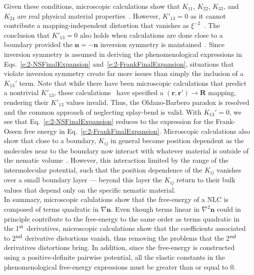 Given these conditions, microscopic calculations show that $K_{11}$, $K_{22}$, $K_{33}$, and $K_{24}$ are real physical material properties~\cite{RN55,RN56,RN225,RN224,RN217,RN222}.
However, $K'_{13} = 0$ as it cannot contribute a mapping-independent distortion that vanishes as $\xi^{-2}$~\cite{RN55,RN225}.
The conclusion that $K'_{13} = 0$ also holds when calculations are done close to a boundary provided the $\mathbf{n} = -\mathbf{n}$ inversion symmetry is maintained~\cite{RN56}.
Since inversion symmetry is assumed in deriving the phenomenological expressions in Eqs.~\ref{e:2-NSFinalExpansion} and~\ref{e:2-FrankFinalExpansion}, situations that violate inversion symmetry create far more issues than simply the inclusion of a $K_{13}'$ term.
Note that while there have been microscopic calculations that predict a nontrivial $K'_{13}$, these calculations~\cite{RN224,RN217,RN222} have specified a $(\mathbf{r},\mathbf{r}') \rightarrow \mathbf{R}$ mapping, rendering their $K'_{13}$ values invalid.
Thus, the Oldano-Barbero paradox is resolved and the common approach of neglecting splay-bend is valid.
With $K_{13}'=0$, we see that Eq.~\ref{e:2-NSFinalExpansion} reduces to the expression for the Frank-Oseen free energy in Eq.~\ref{e:2-FrankFinalExpansion}.
Microscopic calculations also show that close to a boundary, $K_{ij}$ in general become position dependent as the molecules near to the boundary now interact with whatever material is outside of the nematic volume~\cite{RN56,RN57,RN55}.
However, this interaction limited by the range of the intermolecular potential, such that the position dependence of the $K_{ij}$ vanishes over a small boundary layer --- beyond this layer the $K_{ij}$ return to their bulk values that depend only on the specific nematic material.\\


In summary, microscopic calulations show that the free-energy of a NLC is composed of terms quadratic in $\nabla \mathbf{n}$.
Even though terms linear in $\nabla ^2 \mathbf{n}$ could in principle contribute to the free-energy to the same order as terms quadratic in the 1$^\textup{st}$ derivatives, microscopic calculations show that the coefficients associated to 2$^\textup{nd}$ derivative distortions vanish, thus removing the problems that the 2$^\textup{nd}$ derivatives distortions bring.
In addition, since the free-energy is constructed using a positive-definite pairwise potential, all the elastic constants in the phenomenological free-energy expressions must be greater than or equal to 0.


